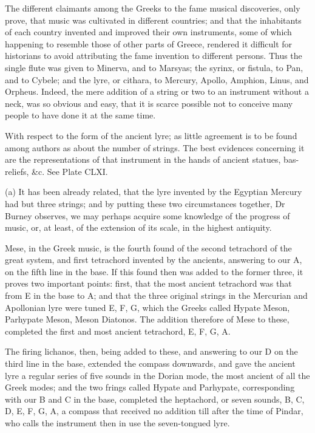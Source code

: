 \documentclass{article}
\begin{document}
The different claimants among the Greeks to the fame musical discoveries, only prove, that music was cultivated in different countries; and that the inhabitants of each country invented and improved their own instruments, some of which happening to resemble those of other parts of Greece, rendered it difficult for historians to avoid attributing the fame invention to different persons. Thus the single flute was given to Minerva, and to Marsyas; the syrinx, or fistula, to Pan, and to Cybele; and the lyre, or cithara, to Mercury, Apollo, Amphion, Linus, and Orpheus. Indeed, the mere addition of a string or two to an instrument without a neck, was so obvious and easy, that it is scarce possible not to conceive many people to have done it at the same time.

With respect to the form of the ancient lyre; as little agreement is to be found among authors as about the number of strings. The best evidences concerning it are the representations of that instrument in the hands of ancient statues, bas-reliefs, \&c. See Plate CLXI.

(a) It has been already related, that the lyre invented by the Egyptian Mercury had but three strings; and by putting these two circumstances together, Dr Burney observes, we may perhaps acquire some knowledge of the progress of music, or, at least, of the extension of its scale, in the highest antiquity.

Mese, in the Greek music, is the fourth found of the second tetrachord of the great system, and first tetrachord invented by the ancients, answering to our A, on the fifth line in the base. If this found then was added to the former three, it proves two important points: first, that the most ancient tetrachord was that from E in the base to A; and that the three original strings in the Mercurian and Apollonian lyre were tuned E, F, G, which the Greeks called Hypate Meson, Parhypate Meson, Meson Diatonos. The addition therefore of Mese to these, completed the first and most ancient tetrachord, E, F, G, A.

The firing lichanos, then, being added to these, and answering to our D on the third line in the base, extended the compass downwards, and gave the ancient lyre a regular series of five sounds in the Dorian mode, the most ancient of all the Greek modes; and the two frings called Hypate and Parhypate, corresponding with our B and C in the base, completed the heptachord, or seven sounds, B, C, D, E, F, G, A, a compass that received no addition till after the time of Pindar, who calls the instrument then in use the seven-tongued lyre.
\end{document}
